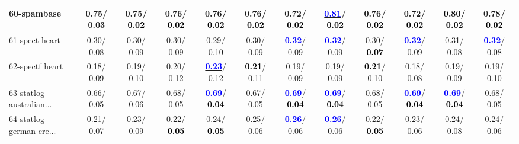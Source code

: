 \begin{table}[h]
\begin{center}
{\begin{tabular}{lc|c|c|c|c|c|c|c|c|c|c}
60-spambase &   0.75/  0.03 &   0.75/\textcolor{black}{\textbf{  0.02}} &   0.76/\textcolor{black}{\textbf{  0.02}} &   0.76/\textcolor{black}{\textbf{  0.02}} &   0.76/\textcolor{black}{\textbf{  0.02}} &   0.72/\textcolor{black}{\textbf{  0.02}} & \underline{\textcolor{blue}{\textbf{  0.81}}}/\textcolor{black}{\textbf{  0.02}} &   0.76/\textcolor{black}{\textbf{  0.02}} &   0.72/\textcolor{black}{\textbf{  0.02}} & \textcolor{black}{\textbf{  0.80}}/\textcolor{black}{\textbf{  0.02}} &   0.78/\textcolor{black}{\textbf{  0.02}} \\ \hline
61-spect heart &   0.30/  0.08 &   0.30/  0.09 &   0.30/  0.09 &   0.29/  0.10 &   0.30/  0.09 & \textcolor{blue}{\textbf{  0.32}}/  0.09 & \textcolor{blue}{\textbf{  0.32}}/  0.09 &   0.30/\textcolor{black}{\textbf{  0.07}} & \textcolor{blue}{\textbf{  0.32}}/  0.09 &   0.31/  0.08 & \textcolor{blue}{\textbf{  0.32}}/  0.08 \\
62-spectf heart &   0.18/  0.09 &   0.19/  0.10 &   0.20/  0.12 & \underline{\textcolor{blue}{\textbf{  0.23}}}/  0.12 & \textcolor{black}{\textbf{  0.21}}/  0.11 &   0.19/  0.09 &   0.19/  0.09 & \textcolor{black}{\textbf{  0.21}}/  0.10 &   0.18/  0.08 &   0.19/  0.09 &   0.19/  0.10 \\
63-statlog australian... &   0.66/  0.05 &   0.67/  0.06 &   0.68/  0.05 & \textcolor{blue}{\textbf{  0.69}}/\textcolor{black}{\textbf{  0.04}} &   0.67/  0.05 & \textcolor{blue}{\textbf{  0.69}}/\textcolor{black}{\textbf{  0.04}} & \textcolor{blue}{\textbf{  0.69}}/\textcolor{black}{\textbf{  0.04}} &   0.68/  0.05 & \textcolor{blue}{\textbf{  0.69}}/\textcolor{black}{\textbf{  0.04}} & \textcolor{blue}{\textbf{  0.69}}/\textcolor{black}{\textbf{  0.04}} &   0.68/  0.05 \\
64-statlog german cre... &   0.21/  0.07 &   0.23/  0.09 &   0.22/\textcolor{black}{\textbf{  0.05}} &   0.24/\textcolor{black}{\textbf{  0.05}} &   0.25/  0.06 & \textcolor{blue}{\textbf{  0.26}}/  0.06 & \textcolor{blue}{\textbf{  0.26}}/  0.06 &   0.22/\textcolor{black}{\textbf{  0.05}} &   0.23/  0.06 &   0.24/  0.08 &   0.24/  0.06 \\\end{tabular}}\label{stratsALCKappa1aRFwRedux}
\end{center}
\end{table}
